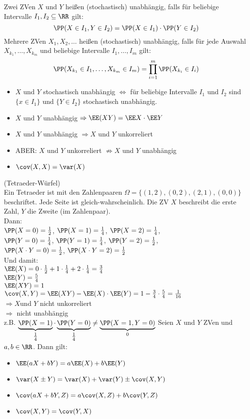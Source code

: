  Zwei ZVen $X$ und $Y$ heißen (stochastisch) unabhängig, falls für beliebige Intervalle $I_1, I_2 \subseteq \RR$ gilt:
$$\PP(X\in I_1, Y\in I_2)=\PP(X\in I_1) \cdot \PP(Y \in I_2)$$
Mehrere ZVen $X_1, X_2, \dots$ heißen (stochastisch) unabhängig, falls für jede Auswahl $X_{k_1}, \dots , X_{k_m}$ und beliebige Intervalle $I_1, \dots, I_m$ gilt:
$$\PP(X_{k_1}\in I_1 , \dots , X_{k_m}\in I_m)=\prod_{i=1}^m \PP(X_{k_i}\in I_i)$$

\begin{itemize}
\item $X$ und $Y$ stochastisch unabhängig $\Leftrightarrow$ für beliebige Intervalle $I_1$ und $I_2$ sind $\{x\in I_1\}$ und $\{ Y \in I_2\}$ stochastisch unabhängig.
\item $X$ und $Y$ unabhängig $\Rightarrow \EE(XY)=\EE X \cdot \EE Y$
\item $X$ und $Y$ unabhängig $\Rightarrow X$ und $Y$ unkorreliert
\item ABER: $X$ und $Y$ unkorreliert $\not\Rightarrow X$ und $Y$ unabhängig
\item $\cov(X,X) = \var(X)$
\end{itemize}

 (Tetraeder-Würfel)\\
Ein Tetraeder ist mit den Zahlenpaaren $\Omega=\{(1,2),(0,2),(2,1),(0,0)\}$ beschriftet. Jede Seite ist gleich-wahrscheinlich. Die ZV $X$ beschreibt die erste Zahl, $Y$ die Zweite (im Zahlenpaar).\\
Dann:\\
$\PP(X=0)=\tfrac{1}{2}$, $\PP(X=1)=\tfrac{1}{4}$, $\PP(X=2) = \tfrac{1}{4}$,\\ $\PP(Y=0) = \tfrac{1}{4}$,
$\PP(Y=1) = \tfrac{1}{4}$, $\PP(Y=2) = \tfrac{1}{2}$, \\$\PP(X\cdot Y=0) = \tfrac{1}{2}$, $\PP(X\cdot Y = 2) = \tfrac{1}{2}$\\
Und damit:\\
$\EE(X)=0\cdot \frac{1}{2}+1 \cdot \frac{1}{4}+2\cdot \frac{1}{4}=\frac{3}{4}$\\
$\EE(Y)=\frac{5}{4}$\\
$\EE(XY)=1$\\
$\cov(X,Y)=\EE(XY)-\EE(X)\cdot \EE(Y)=1-\frac{3}{4}\cdot\frac{5}{4}=\frac{1}{16}$\\
$\Rightarrow X$und $Y$ nicht unkorreliert\\
$\Rightarrow$ nicht unabhängig\\
z.B. $\underbrace{\PP(X=1)}_{\tfrac{1}{4}}\cdot \underbrace{\PP(Y=0)}_{\tfrac{1}{4}} \not = \underbrace{\PP(X=1,Y=0)}_{0}$
 Seien $X$ und $Y$ ZVen und $a,b\in \RR$. Dann gilt:
\begin{itemize}
\item $\EE(aX+bY)=a\EE(X)+b\EE(Y)$
\item $\var(X\pm Y) = \var(X)+\var(Y)\pm \cov(X,Y)$
\item $\cov(aX+bY,Z)=a\cov(X,Z)+b\cov(Y,Z)$
\item $\cov(X,Y)=\cov(Y,X)$
\end{itemize}

